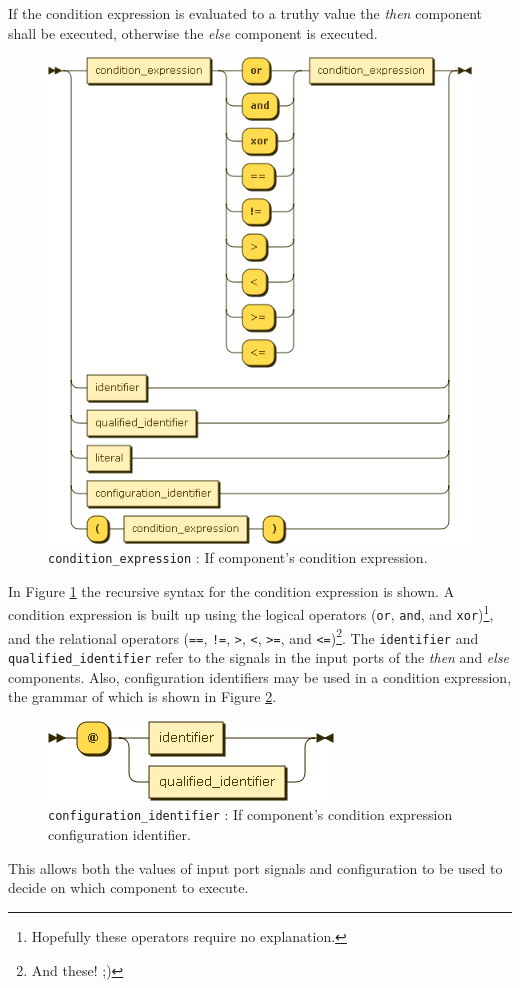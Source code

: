 If the condition expression is evaluated to a truthy value the \emph{then} component shall be executed, otherwise the \emph{else} component is executed.
\begin{figure}[h!]
  \centering
    \includegraphics[scale=\DiagramScale]{chapters/compiler/diagrams/condition_expression}
  \caption{\texttt{condition\_expression} : If component's condition expression.}
  \label{fig:pcl-cond-expr}
\end{figure}
In Figure \ref{fig:pcl-cond-expr} the recursive syntax for the condition expression is shown. A condition expression is built up using the logical operators (\texttt{or}, \texttt{and}, and \texttt{xor})\footnote{Hopefully these operators require no explanation.}, and the relational operators (\texttt{==}, \texttt{!=}, \texttt{>}, \texttt{<}, \texttt{>=}, and \texttt{<=})\footnote{And these! ;)}. The \texttt{identifier} and \texttt{qualified\_identifier} refer to the signals in the input ports of the \emph{then} and \emph{else} components. Also, configuration identifiers may be used in a condition expression, the grammar of which is shown in Figure \ref{fig:pcl-config-id}.
\begin{figure}[h!]
  \centering
    \includegraphics[scale=\DiagramScale]{chapters/compiler/diagrams/configuration_identifier}
  \caption{\texttt{configuration\_identifier} : If component's condition expression configuration identifier.}
  \label{fig:pcl-config-id}
\end{figure}
This allows both the values of input port signals and configuration to be used to decide on which component to execute.

